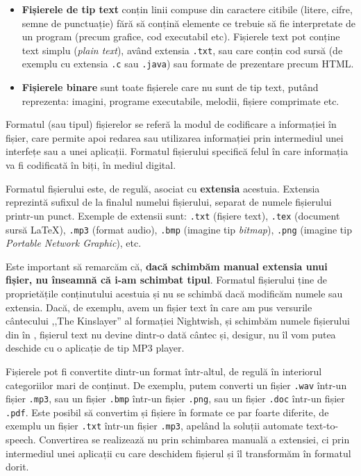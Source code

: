 \begin{itemize}
  \item \textbf{Fișierele de tip text} conțin linii compuse din caractere citibile (litere, cifre, semne de punctuație) fără să conțină elemente ce trebuie să fie interpretate de un program (precum grafice, cod executabil etc).
    Fișierele text pot conține text simplu (\textit{plain text}), având extensia \texttt{.txt}, sau care conțin cod sursă (de exemplu cu extensia \texttt{.c} sau \texttt{.java}) sau formate de prezentare precum HTML.
  \item \textbf{Fișierele binare} sunt toate fișierele care nu sunt de tip text, putând reprezenta: imagini, programe executabile, melodii, fișiere comprimate etc.
\end{itemize}

Formatul (sau tipul) fișierelor se referă la modul de codificare a informației în fișier, care permite apoi redarea sau utilizarea informației prin intermediul unei interfețe sau a unei aplicații.
Formatul fișierului specifică felul în care informația va fi codificată în biți, în mediul digital.

Formatul fișierului este, de regulă, asociat cu \textbf{extensia} acestuia.
Extensia reprezintă sufixul de la finalul numelui fișierului, separat de numele fișierului printr-un punct.
Exemple de extensii sunt: \texttt{.txt} (fișiere text), \texttt{.tex} (document sursă LaTeX), \texttt{.mp3} (format audio), \texttt{.bmp} (imagine tip \textit{bitmap}), \texttt{.png} (imagine tip \textit{Portable Network Graphic}), etc.

Este important să remarcăm că, \textbf{dacă schimbăm manual extensia unui fișier, nu înseamnă că i-am schimbat tipul}.
Formatul fișierului ține de proprietățile conținutului acestuia și nu se schimbă dacă modificăm numele sau extensia.
Dacă, de exemplu, avem un fișier text în care am pus versurile cântecului ,,The Kinslayer'' al formației Nightwish, și schimbăm numele fișierului din  în , fișierul text nu devine dintr-o dată cântec și, desigur, nu îl vom putea deschide cu o aplicație de tip MP3 player.

Fișierele pot fi convertite dintr-un format într-altul, de regulă în interiorul categoriilor mari de conținut.
De exemplu, putem converti un fișier \texttt{.wav} într-un fișier \texttt {.mp3}, sau un fișier \texttt{.bmp} într-un fișier \texttt{.png}, sau un fișier \texttt{.doc} într-un fișier \texttt{.pdf}.
Este posibil să convertim și fișiere în formate ce par foarte diferite, de exemplu un fișier \texttt{.txt} într-un fișier \texttt{.mp3}, apelând la soluții automate text-to-speech.
Convertirea se realizează nu prin schimbarea manuală a extensiei, ci prin intermediul unei aplicații cu care deschidem fișierul și îl transformăm în formatul dorit.


